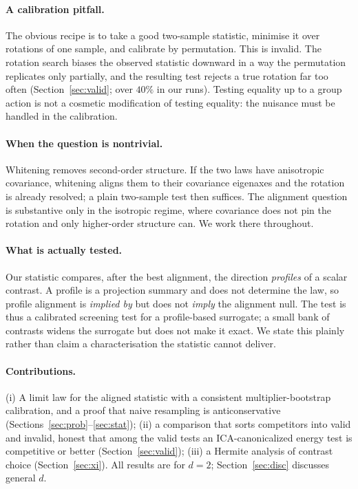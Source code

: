 \documentclass[]{interact}
\theoremstyle{plain}
\theoremstyle{remark}
\begin{document}
\paragraph{A calibration pitfall.} The obvious recipe is to take a good two-sample
statistic, minimise it over rotations of one sample, and calibrate by permutation.
This is invalid. The rotation search biases the observed statistic downward in a
way the permutation replicates only partially, and the resulting test rejects a
true rotation far too often (Section~\ref{sec:valid}; over $40\%$ in our runs).
Testing equality up to a group action is not a cosmetic modification of testing
equality: the nuisance must be handled in the calibration.

\paragraph{When the question is nontrivial.} Whitening removes second-order
structure. If the two laws have anisotropic covariance, whitening aligns them to
their covariance eigenaxes and the rotation is already resolved; a plain two-sample
test then suffices. The alignment question is substantive only in the isotropic
regime, where covariance does not pin the rotation and only higher-order structure
can. We work there throughout.

\paragraph{What is actually tested.} Our statistic compares, after the best
alignment, the direction \emph{profiles} of a scalar contrast. A profile is a
projection summary and does not determine the law, so profile alignment is
\emph{implied by} but does not \emph{imply} the alignment null. The test is thus a
calibrated screening test for a profile-based surrogate; a small bank of contrasts
widens the surrogate but does not make it exact. We state this plainly rather than
claim a characterisation the statistic cannot deliver.

\paragraph{Contributions.} (i) A limit law for the aligned statistic with a
consistent multiplier-bootstrap calibration, and a proof that naive resampling is
anticonservative (Sections~\ref{sec:prob}--\ref{sec:stat}); (ii) a comparison that
sorts competitors into valid and invalid, honest that among the valid tests an
ICA-canonicalized energy test is competitive or better (Section~\ref{sec:valid});
(iii) a Hermite analysis of contrast choice (Section~\ref{sec:xi}). All results are
for $d=2$; Section~\ref{sec:disc} discusses general $d$.
\end{document}
